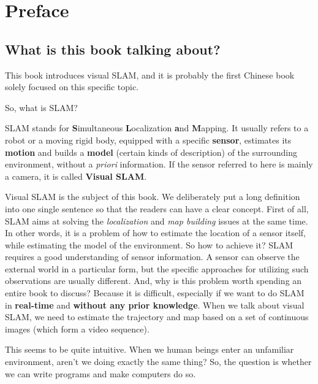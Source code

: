 \chapter{Preface}

\section{What is this book talking about?}

This book introduces visual SLAM, and it is probably the first Chinese book solely focused on this specific topic.

So, what is SLAM?

SLAM stands for \textbf{S}imultaneous \textbf{L}ocalization \textbf{a}nd \textbf{M}apping. It usually refers to a robot or a moving rigid body, equipped with a specific \textbf{sensor}, estimates its \textbf{motion} and builds a \textbf{model} (certain kinds of description) of the surrounding environment, without a \textit{priori} information\cite{Davison2007}. If the sensor referred to here is mainly a camera, it is called \textbf{Visual SLAM}.

Visual SLAM is the subject of this book. We deliberately put a long definition into one single sentence so that the readers can have a clear concept. First of all, SLAM aims at solving the \textit{localization} and \textit{map building} issues at the same time. In other words, it is a problem of how to estimate the location of a sensor itself, while estimating the model of the environment. So how to achieve it? SLAM requires a good understanding of sensor information. A sensor can observe the external world in a particular form, but the specific approaches for utilizing such observations are usually different. And, why is this problem worth spending an entire book to discuss? Because it is difficult, especially if we want to do SLAM in \textbf{real-time} and \textbf{without any prior knowledge}. When we talk about visual SLAM, we need to estimate the trajectory and map based on a set of continuous images (which form a video sequence).

This seems to be quite intuitive. When we human beings enter an unfamiliar environment, aren't we doing exactly the same thing? So, the question is whether we can write programs and make computers do so. 

